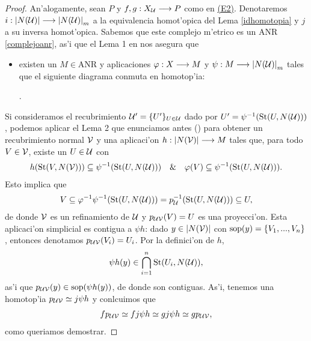 \begin{proof}
    An'alogamente, sean $ P  $ y $ f,g:X_{\mathcal{U}} \longrightarrow P  $ como en \hyperref[e2]{(E2)}. Denotaremos $ i:\abs{N(\mathcal{U} )}\longrightarrow \abs{N(\mathcal{U} )}_m  $ a la equivalencia homot'opica del Lema \ref{idhomotopia} y $ j  $ a su inversa homot'opica. Sabemos que este complejo m'etrico es un ANR \ref{complejoanr}, as'i que el Lema 1 en \cite[p. 46]{mardešić1982shape} nos asegura que 
    \begin{itemize}
      \item[] existen un $ M\in \text{ANR} $ y aplicaciones $ \varphi:X\longrightarrow M  $ y $ \psi:M\longrightarrow \abs{N(\mathcal{U})}_m  $ tales que el siguiente diagrama conmuta en homotop'ia:
      \begin{center}
        .
      \end{center}
    \end{itemize}  
    Si consideramos el recubrimiento $ \mathcal{U}' = \{U'\}_{U\in \mathcal{U} } $ dado por $ U' = \psi^{-1}(\operatorname{St} (U, N(\mathcal{U} ))) $, podemos aplicar el Lema 2 que enunciamos antes (\cite[p. 316]{mardešić1982shape}) para obtener un recubrimiento normal $ \mathcal{V}  $ y una aplicaci'on $ h : \abs{N(\mathcal{V} )}\longrightarrow M  $ tales que, para todo $ V\in \mathcal{V}  $, existe un $ U\in \mathcal{U}  $ con
    \begin{gather*}
      h(\operatorname{St}(V,N(\mathcal{V} ))) \subseteq \psi^{-1}(\operatorname{St}(U,N(\mathcal{U} ))) \quad \& \quad \varphi(V )\subseteq \psi^{-1} (\operatorname{St}(U,N(\mathcal{U}  ))).
    \end{gather*}
    Esto implica que 
    \begin{gather*}
      V\subseteq \varphi^{-1}\psi^{-1}(\operatorname{St}(U,N(\mathcal{U} )))  =  p_{\mathcal{U}}^{-1}(\operatorname{St}(U,N(\mathcal{U}))) \subseteq U,
    \end{gather*}
    de donde $\mathcal{V} $ es un refinamiento de $ \mathcal{U}  $ y $ p_{\mathcal{U}\mathcal{V}} (V) = U $ es una proyecci'on. Esta aplicaci'on simplicial es contigua a $ \psi h  $: dado $ y\in \abs{N(\mathcal{V} )} $ con $ \operatorname{sop}(y) = \{V_1,...,V_n \} $, entonces denotamos $ p_{\mathcal{U}\mathcal{V}}(V_i) = U_i  $. Por la definici'on de $ h  $, 
    \begin{gather*}
      \psi h(y)\in \bigcap_{i=1}^n \operatorname{St}(U_i,N(\mathcal{U})), 
    \end{gather*}
    as'i que $ p_{\mathcal{U}\mathcal{V}}(y)\in \operatorname{sop}(\psi h(y)) $, de donde son contiguas. As'i, tenemos una homotop'ia $ p_{\mathcal{U}\mathcal{V}}\simeq j \psi h  $ y conlcuimos que 
    \begin{gather*}
      fp_{\mathcal{U}\mathcal{V}} \simeq f  j\psi h \simeq g j\psi h \simeq g p_{\mathcal{U}\mathcal{V} },
    \end{gather*}
    como queriamos demostrar.
\end{proof}


